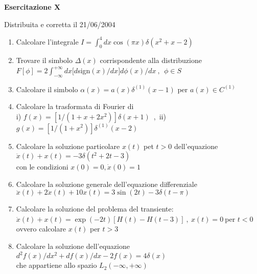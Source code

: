 \documentclass[a4paper,10pt]{article}
\begin{document}
\newpage

\centerline{\LARGE \bf Esercitazione X}
\centerline{Distribuita e corretta il  21/06/2004}

\vskip10pt

\begin{enumerate}
\item Calcolare l'integrale $I=\int_0^4dx\cos(\pi x)\delta(x^2+x-2)$ 
\item Trovare il simbolo $\Delta(x)$ corrispondente alla distribuzione 
\\$F[\phi]=2\int_{-\infty}^{+\infty}dx[d$sign$(x)/dx]d\phi(x)/dx~,~~
\phi \in S$
\item Calcolare il simbolo $\alpha(x)=a(x)\delta^{(1)}(x-1)$ per
$a(x)\in C^{(1)}$  
\item Calcolare la trasformata di Fourier di\\ i) $f(x)=[1/(1+x+2x^2)]
\delta(x+1)$~,~ii) $g(x)=[1/(1+x^2)]\delta^{(1)}(x-2)$
\item Calcolare la soluzione particolare $x(t)$ pet $t>0$ dell'equazione\\
$\ddot{x}(t)+x(t)=-3\delta(t^2+2t-3)$ \\ con le condizioni $x(0)=0,
\dot{x}(0)=1$ 
\item Calcolare la soluzione generale dell'equazione differenziale\\
$\ddot{x}(t)+2\dot{x}(t)+10x(t)=3\sin(2t)-3\delta(t-\pi)$
\item Calcolare la soluzione del problema del transiente:\\
$\ddot{x}(t)+x(t)=\exp(-2t)[H(t)-H(t-3)]~,~x(t)=0~$per $t< 0$\\
ovvero calcolare $x(t)$ per $t>3$
\item Calcolare la soluzione dell'equazione\\
$d^2f(x)/dx^2+df(x)/dx-2f(x)=4\delta(x)$\\
che appartiene allo spazio $L_2(-\infty,+\infty)$

\end{enumerate}

\newpage
\end{document}
